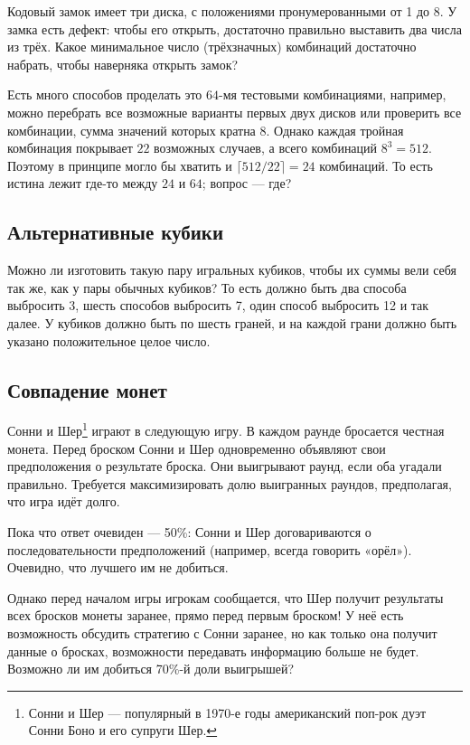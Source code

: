 Кодовый замок имеет три диска, с положениями пронумерованными от 1 до 8.
У замка есть дефект: чтобы его открыть, достаточно правильно выставить два числа из трёх.
Какое минимальное число (трёхзначных) комбинаций достаточно набрать, чтобы наверняка открыть замок?

Есть много способов проделать это $64$-мя тестовыми комбинациями, например, можно перебрать все возможные варианты первых двух дисков или проверить все комбинации, сумма значений которых кратна 8.
Однако каждая тройная комбинация покрывает $22$ возможных случаев, а всего комбинаций $8^3 = 512$.
Поэтому в принципе могло бы хватить и $\lceil 512/22 \rceil = 24$ комбинаций.
То есть истина лежит где-то между $24$ и $64$; вопрос --- где?

\subsection*{Альтернативные кубики}

 
Можно ли изготовить такую пару игральных кубиков, чтобы их суммы вели себя так же, как у пары обычных кубиков?
То есть должно быть два способа выбросить 3, шесть способов выбросить 7, один способ выбросить 12 и так далее.
У кубиков должно быть по шесть граней, и на каждой грани должно быть указано положительное целое число.

\subsection*{Совпадение монет}

Сонни и Шер\footnote{Сонни и Шер --- популярный в 1970-е годы американский поп-рок дуэт Сонни Боно и его супруги Шер.\pr} играют в следующую игру.
В каждом раунде бросается честная монета.
Перед броском Сонни и Шер одновременно объявляют свои предположения о результате броска.
Они выигрывают раунд, если оба угадали правильно.
Требуется максимизировать долю выигранных раундов, предполагая, что игра идёт долго.

Пока что ответ очевиден --- 50\%: Сонни и Шер договариваются о последовательности предположений (например, всегда говорить «орёл»).
Очевидно, что лучшего им не добиться.

Однако перед началом игры игрокам сообщается, что Шер получит результаты всех бросков монеты заранее, прямо перед первым броском!
У неё есть возможность обсудить стратегию с Сонни заранее, но как только она получит данные о бросках, возможности передавать информацию больше не будет.
Возможно ли им добиться 70\%-й доли выигрышей?

